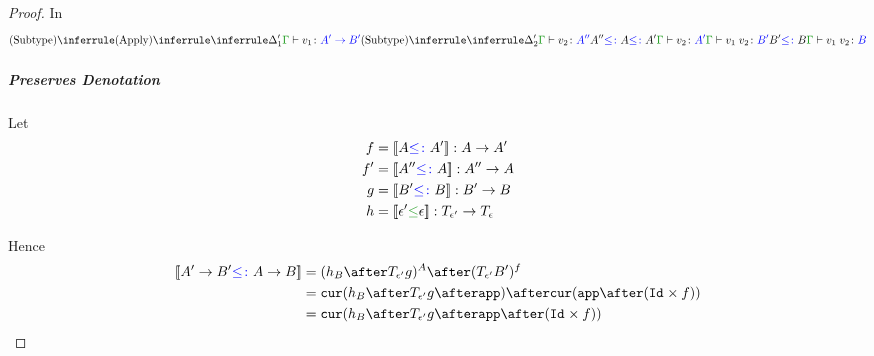 \documentclass{report}
\begin{document}
\begin{framed}
\begin{proof}
                In
                \begin{equation}
                    \ntreeruleII{\vsubtype}{
                        \ntreeruleII{\vapply}{
                            \treeruleI{
                                \D'_1
                            }{
                                \gtyperelation{v_1}{\fntype{A'}{B'}}
                            }
                        }{
                            \ntreeruleII{\vsubtype}{
                                \treeruleI{\D'_2}{\gtyperelation{v_2}{A''}}
                                }{
                                A'' \subtype A \subtype A'
                            } {
                                \gtyperelation{v_2}{A'}
                            }
                        }{
                            \gtyperelation{\apply{v_1}{v_2}}{B'}
                        }
                        }{
                        B' \subtype B
                    }{
                        \gtyperelation{\apply{v_1}{v_2}}{B}
                    }
                \end{equation}
                \subparagraph{Preserves Denotation}
                    Let
                    \begin{align*}
                        f & = \deno{A\subtype A'}: A\rightarrow A' \\
                        f' & = \deno{A''\subtype A}: A'' \rightarrow A \\
                        g & = \deno{B' \subtype B}: B' \rightarrow B \\
                        h & = \deno{\e' \subeffect \e}: \T{\e'}{} \rightarrow \T{\e}{}
                    \end{align*}
        
                    Hence 
                    \begin{align*}
                        \deno{\fntype{A'}{B'}\subtype \ab} & = (h_B\after\T{\e'}{g})^A \after (\T{\e'}{B'})^f \\
                        & = \cur{h_B\after\T{\e'}{g}\after \app}\after\cur{\app\after(\Id{}\times f)}\\
                        & = \cur {h_B\after\T{\e'}{g}\after\app\after(\Id{}\times f)}
                    \end{align*}
        

\end{proof}
\end{framed}
\end{document}
